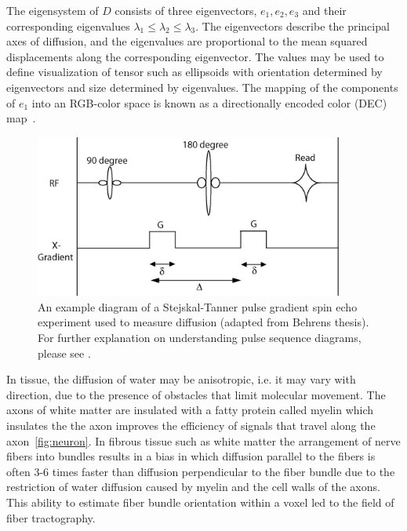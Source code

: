 The eigensystem of $D$ consists of three eigenvectors, $e_1, e_2, e_3$ and their corresponding eigenvalues $\lambda_1  \le \lambda_2 \le \lambda_3$. The eigenvectors describe the principal axes of diffusion, and the eigenvalues are proportional to the mean squared displacements along the corresponding eigenvector. The values may be used to define visualization of tensor such as ellipsoids with orientation determined by eigenvectors and size determined by eigenvalues. The mapping of the components of $e_1$ into an RGB-color space is known as a directionally encoded color (DEC) map~\cite{Pajevic1999}.
  
\begin{figure}[ht]
\begin{center}
\includegraphics[width=4in]{figures/sequence}
\caption{
\label{fig:sequence}
An example diagram of a Stejskal-Tanner pulse gradient spin echo experiment used to measure diffusion (adapted from Behrens thesis).  For further explanation on understanding pulse sequence diagrams, please see \cite{Haacke}.}
\end{center}
\end{figure}
  
In tissue, the diffusion of water may be anisotropic, i.e. it may vary with direction, due to the presence of obstacles that limit molecular movement.  The axons of white matter are insulated with a fatty protein called myelin which insulates the the axon improves the efficiency of signals that travel along the axon~\ref{fig:neuron}. In fibrous tissue such as white matter the arrangement of nerve fibers into bundles results in a bias in which diffusion parallel to the fibers is often 3-6 times faster than diffusion perpendicular to the fiber bundle \cite{LeBihanNATURE2003} due to the restriction of water diffusion caused by myelin and the cell walls of the axons.  This ability to estimate fiber bundle orientation within a voxel led to the field of fiber tractography.  

